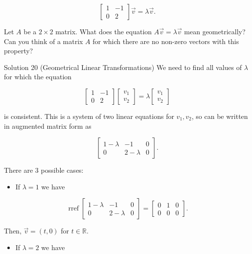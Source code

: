 \documentclass[10pt]{article}
\begin{document}
$$
\left[\begin{array}{cc}
1 & -1 \\
0 & 2
\end{array}\right] \vec{v}=\lambda \vec{v} .
$$

Let $A$ be a $2 \times 2$ matrix. What does the equation $A \vec{v}=\lambda \vec{v}$ mean geometrically? Can you think of a matrix $A$ for which there are no non-zero vectors with this property?

Solution 20 (Geometrical Linear Transformations) We need to find all values of $\lambda$ for which the equation

$$
\left[\begin{array}{cc}
1 & -1 \\
0 & 2
\end{array}\right]\left[\begin{array}{l}
v_{1} \\
v_{2}
\end{array}\right]=\lambda\left[\begin{array}{l}
v_{1} \\
v_{2}
\end{array}\right]
$$

is consistent. This is a system of two linear equations for $v_{1}, v_{2}$, so can be written in augmented matrix form as

$$
\left[\begin{array}{cc|c}
1-\lambda & -1 & 0 \\
0 & 2-\lambda & 0
\end{array}\right] .
$$

There are 3 possible cases:

\begin{itemize}
  \item If $\lambda=1$ we have
\end{itemize}

$$
\operatorname{rref}\left[\begin{array}{cc|c}
1-\lambda & -1 & 0 \\
0 & 2-\lambda & 0
\end{array}\right]=\left[\begin{array}{ll|l}
0 & 1 & 0 \\
0 & 0 & 0
\end{array}\right] .
$$

Then, $\vec{v}=(t, 0)$ for $t \in \mathbb{R}$.

\begin{itemize}
  \item If $\lambda=2$ we have
\end{itemize}
\end{document}
